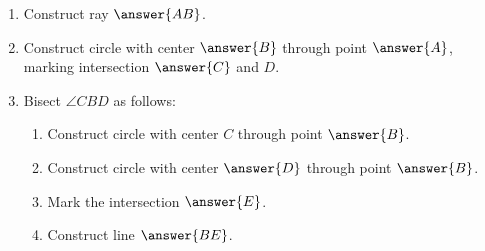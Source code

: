 \documentclass[nooutcomes]{ximera}
\begin{document}
\begin{problem}
\begin{problem}
\begin{enumerate}
\item Construct ray $\answer{AB}$. 
\item Construct circle with center $\answer{B}$ through point $\answer{A}$, marking intersection $\answer{C}$ and $D$. 
\item Bisect $\angle CBD$ as follows: 
\begin{enumerate}
\item Construct circle with center $C$ through point $\answer{B}$. 
\item Construct circle with center $\answer{D}$ through point $\answer{B}$.
\item Mark the intersection $\answer{E}$.
\item Construct line $\answer{BE}$. 
\end{enumerate}
\end{enumerate}


\end{problem}
\end{problem}
\end{document}
